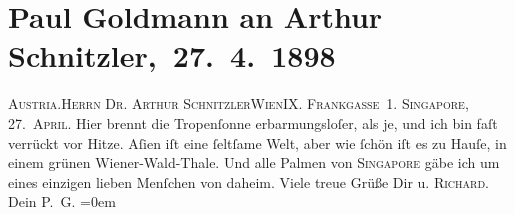 

         
         \renewcommand{\erwaehntePersonen}{Personen: Richard Beer-Hofmann}
         \renewcommand{\erwaehnteOrte}{Orte: Asien, Frankgasse, Singapur, Wien, Wienerwald, Österreich}
         \renewcommand{\erwaehnteWerke}{}
               \section[ Paul Goldmann an Arthur Schnitzler, 27. 4. 1898]{ Paul Goldmann an Arthur Schnitzler, 27. 4. 1898}\nopagebreak{}\rehead{ }\begin{ledgroupsized}[t]{13cm}\normalsize\beginnumbering \toendnotes[C]{\smallbreak\pagebreak[2]} 
\pstart{}{\pb}\textsc{Austria}.\pend{}\pstart{}\textsc{Herrn Dr. Arthur Schnitzler}\pend{}\pstart{}\textsc{Wien}\pend{}\pstart{}\textsc{IX. Frankgaſse 1}.\pend{}{\bigskip}\pstart
           {\pb}\textsc{Singapore}, 27. \textsc{April}.\pend
           \pstart
           Hier brennt die Tropenſonne erbarmungsloſer, als je, und ich bin faſt verrückt vor
               Hitze. Aſien iſt eine ſeltſame Welt, aber wie
               ſchön iſt es zu Hauſe, in einem grünen Wiener-Wald-Thale. Und alle Palmen von \textsc{Singapore} gäbe ich um eines einzigen lieben Menſchen von daheim.\pend
           \pstart
           Viele treue Grüße Dir u. \textsc{Richard}.{\\[\baselineskip]}Dein \spacefill\mbox{P. G.}\pend
           \leftskip=0em{}
         
         \endnumbering{}\end{ledgroupsized}  \newcommand{\dateiname}{L02851}\newcommand{\titel}{Paul Goldmann an Arthur Schnitzler, 27. 4. 1898}\newcommand{\editorInnen}{Martin Anton Müller und Laura Untner}
      